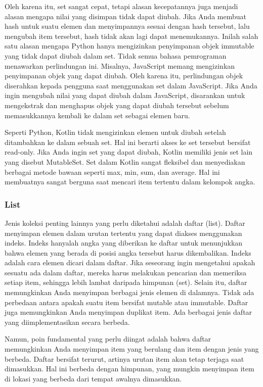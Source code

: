 \documentclass{article}
\begin{document}
Oleh karena itu, set sangat cepat, tetapi alasan kecepatannya juga menjadi alasan mengapa nilai yang disimpan tidak dapat diubah. Jika Anda membuat hash untuk suatu elemen dan menyimpannya sesuai dengan hash tersebut, lalu mengubah item tersebut, hash tidak akan lagi dapat menemukannya. Inilah salah satu alasan mengapa Python hanya mengizinkan penyimpanan objek immutable yang tidak dapat diubah dalam set. Tidak semua bahasa pemrograman menawarkan perlindungan ini. Misalnya, JavaScript memang mengizinkan penyimpanan objek yang dapat diubah. Oleh karena itu, perlindungan objek diserahkan kepada pengguna saat menggunakan set dalam JavaScript. Jika Anda ingin mengubah nilai yang dapat diubah dalam JavaScript, disarankan untuk mengekstrak dan menghapus objek yang dapat diubah tersebut sebelum memasukkannya kembali ke dalam set sebagai elemen baru.

Seperti Python, Kotlin tidak mengizinkan elemen untuk diubah setelah ditambahkan ke dalam sebuah set. Hal ini berarti akses ke set tersebut bersifat read-only. Jika Anda ingin set yang dapat diubah, Kotlin memiliki jenis set lain yang disebut MutableSet. Set dalam Kotlin sangat fleksibel dan menyediakan berbagai metode bawaan seperti max, min, sum, dan average. Hal ini membuatnya sangat berguna saat mencari item tertentu dalam kelompok angka.

\subsubsection{List}
Jenis koleksi penting lainnya yang perlu diketahui adalah daftar (list). Daftar menyimpan elemen dalam urutan tertentu yang dapat diakses menggunakan indeks. Indeks hanyalah angka yang diberikan ke daftar untuk menunjukkan bahwa elemen yang berada di posisi angka tersebut harus dikembalikan. Indeks adalah cara elemen dicari dalam daftar. Jika seseorang ingin mengetahui apakah sesuatu ada dalam daftar, mereka harus melakukan pencarian dan memeriksa setiap item, sehingga lebih lambat daripada himpunan (set). Selain itu, daftar memungkinkan Anda menyimpan berbagai jenis elemen di dalamnya. Tidak ada perbedaan antara apakah suatu item bersifat mutable atau immutable. Daftar juga memungkinkan Anda menyimpan duplikat item. Ada berbagai jenis daftar yang diimplementasikan secara berbeda.

Namun, poin fundamental yang perlu diingat adalah bahwa daftar memungkinkan Anda menyimpan item yang berulang dan item dengan jenis yang berbeda. Daftar bersifat terurut, artinya urutan item akan tetap terjaga saat dimasukkan. Hal ini berbeda dengan himpunan, yang mungkin menyimpan item di lokasi yang berbeda dari tempat awalnya dimasukkan.
\end{document}
